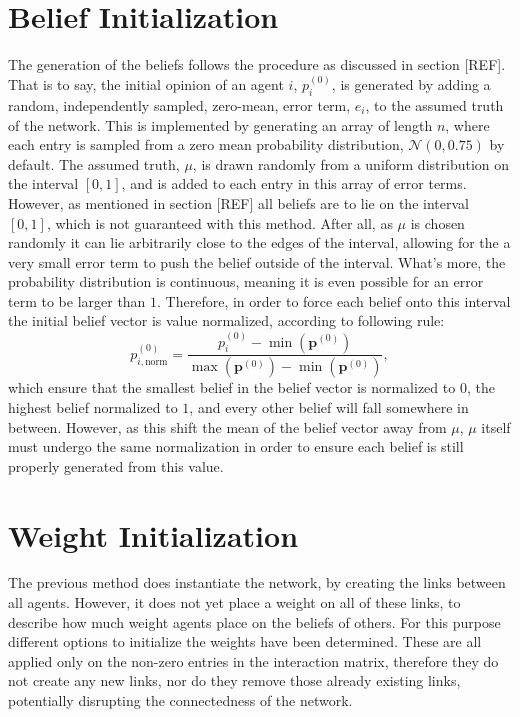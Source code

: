 \documentclass{article}
\newcommand{\beli}[3][2]{p_{#2}^{(#3)}}
\begin{document}
\section{Belief Initialization}

The generation of the beliefs follows the procedure as discussed in section [REF]. That is to say, the initial opinion of an agent $i$, $\beli{i}{0}$, is generated by adding a random, independently sampled, zero-mean, error term, $e_i$, to the assumed truth of the network. This is implemented by generating an array of length $n$, where each entry is sampled from a zero mean probability distribution, $\mathcal{N}(0, 0.75)$ by default. The assumed truth, $\mu$, is drawn randomly from a uniform distribution on the interval $[0, 1]$, and is added to each entry in this array of error terms. \newline
However, as mentioned in section [REF] all beliefs are to lie on the interval $[0, 1]$, which is not guaranteed with this method. After all, as $\mu$ is chosen randomly it can lie arbitrarily close to the edges of the interval, allowing for the a very small error term to push the belief outside of the interval. What's more, the probability distribution is continuous, meaning it is even possible for an error term to be larger than $1$.  Therefore, in order to force each belief onto this interval the initial belief vector is value normalized, according to following rule:
\begin{equation*}
    \beli{i, \text{norm}}{0} = \frac{\beli{i}{0} - \min(\textbf{p}^{(0)})}{\max(\textbf{p}^{(0)}) - \min(\textbf{p}^{(0)})},
\end{equation*}
which ensure that the smallest belief in the belief vector is normalized to $0$, the highest belief normalized to $1$, and every other belief will fall somewhere in between. However, as this shift the mean of the belief vector away from $\mu$, $\mu$ itself must undergo the same normalization in order to ensure each belief is still properly generated from this value.
\newline

\section{Weight Initialization}

The previous method does instantiate the network, by creating the links between all agents. However, it does not yet place a weight on all of these links, to describe how much weight agents place on the beliefs of others. For this purpose different options to initialize the weights have been determined. These are all applied only on the non-zero entries in the interaction matrix, therefore they do not create any new links, nor do they remove those already existing links, potentially disrupting the connectedness of the network.
\end{document}
